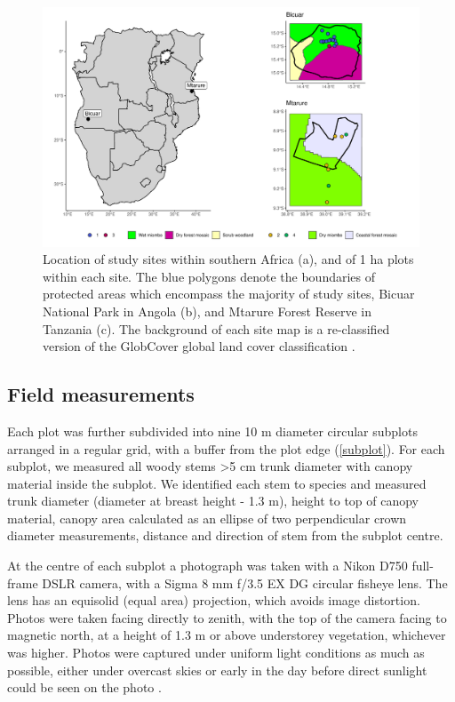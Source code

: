 \documentclass[11pt,a4paper]{article}
\begin{document}
\begin{figure}[H]
\centering
	\includegraphics[width=\textwidth]{map}
	\caption{Location of study sites within southern Africa (a), and of 1 ha plots within each site. The blue polygons denote the boundaries of protected areas which encompass the majority of study sites, Bicuar National Park in Angola (b), and Mtarure Forest Reserve in Tanzania (c). The background of each site map is a re-classified version of the GlobCover global land cover classification \citep{Globcover}.}
	\label{map}
\end{figure}

\subsection{Field measurements}

Each plot was further subdivided into nine 10 m diameter circular subplots arranged in a regular grid, with a buffer from the plot edge (\autoref{subplot}). For each subplot, we measured all woody stems >5 cm trunk diameter with canopy material inside the subplot. We identified each stem to species and measured trunk diameter (diameter at breast height - 1.3 m), height to top of canopy material, canopy area calculated as an ellipse of two perpendicular crown diameter measurements, distance and direction of stem from the subplot centre.

At the centre of each subplot a photograph was taken with a Nikon D750 full-frame DSLR camera, with a Sigma 8 mm f/3.5 EX DG circular fisheye lens. The lens has an equisolid (equal area) projection, which avoids image distortion. Photos were taken facing directly to zenith, with the top of the camera facing to magnetic north, at a height of 1.3 m or above understorey vegetation, whichever was higher. Photos were captured under uniform light conditions as much as possible, either under overcast skies or early in the day before direct sunlight could be seen on the photo \citep{MacFarlane2011}. 
\end{document}
